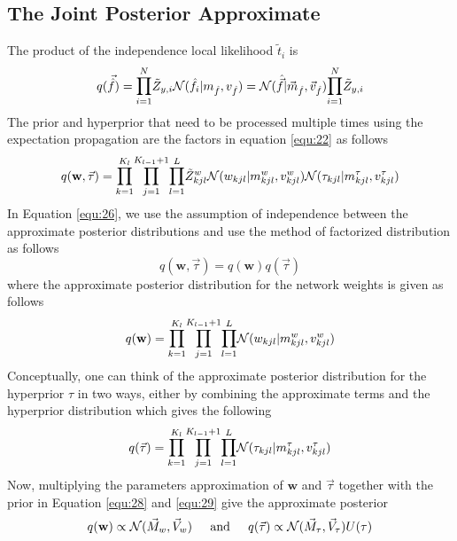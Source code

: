 \documentclass[]{article}
\begin{document}
\subsection*{The Joint Posterior Approximate}
The product of the independence local likelihood $\tilde{t}_i$ is 
\begin{equation}
	q(\vec{\hat{f}}) = \mathlarger \prod_{i=1}^N \tilde{Z}_{y,i} \mathcal{N}(\hat{f}_i|m_{\hat{f}},v_{\hat{f}}) = \mathcal{N}(\hat{\vec{f}}|\vec{m}_{\hat{f}}, \vec{v}_{\hat{f}}) \mathlarger \prod_{i=1}^{N} \tilde{Z}_{y,i}
	\label{equ:25}
\end{equation}
The prior and hyperprior that need to be processed multiple times using the expectation propagation are the factors in equation \ref{equ:22} as follows 
\begin{equation}
	q(\mathbf{w}, \vec{\tau}) = \mathlarger \prod_{k=1}^{K_l}\mathlarger \prod_{j=1}^{K_{l-1}+1}\mathlarger \prod_{l=1}^{L} \tilde{Z}_{kjl}^w\mathcal{N}(w_{kjl}|m_{kjl}^w,v_{kjl}^w)\mathcal{N}(\tau_{kjl}|m_{kjl}^{\tau},v_{kjl}^{\tau})
	\label{equ:26}
\end{equation}
In Equation \ref{equ:26}, we use the assumption of independence between the approximate posterior distributions and use the method of factorized distribution as follows
\begin{equation}
	q(\mathbf{w}, \vec{\tau}) = q(\mathbf{w})q(\vec{\tau})
	\label{equ:27}
\end{equation}
where the approximate posterior distribution for the network weights is given as follows 
\begin{equation}
	q(\mathbf{w}) = \mathlarger \prod_{k=1}^{K_l}\mathlarger \prod_{j=1}^{K_{l-1}+1}\mathlarger \prod_{l=1}^{L} \mathcal{N}(w_{kjl}|m_{kjl}^w,v_{kjl}^w)
	\label{equ:28}
\end{equation}
Conceptually, one can think of the approximate posterior distribution for the hyperprior $\tau$ in two ways, either by combining the approximate terms and the hyperprior distribution which gives the following 
\begin{equation}
	q(\vec{\tau}) = \mathlarger \prod_{k=1}^{K_l}\mathlarger \prod_{j=1}^{K_{l-1}+1}\mathlarger \prod_{l=1}^{L} \mathcal{N}(\tau_{kjl}|m_{kjl}^{\tau},{v}_{kjl}^{\tau}) %
	\label{equ:29}
\end{equation}
Now, multiplying the parameters approximation of $\mathbf{w}$ and $\vec{\tau}$ together with the prior in Equation \ref{equ:28} and \ref{equ:29} give the approximate posterior
\begin{equation}
	q(\mathbf{w}) \propto \mathcal{N}(\vec{M}_w, \vec{V}_{w}) \hspace*{0.2in} \text{and} \hspace*{0.2in} q(\vec{\tau}) \propto \mathcal{N}(\vec{M}_\tau, \vec{V}_{\tau})U(\tau)
	\label{equ:30}
\end{equation} 
\end{document}
